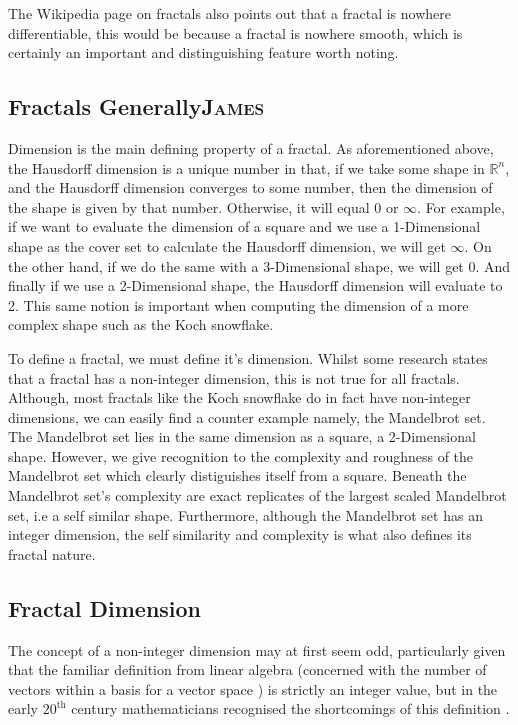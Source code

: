 \documentclass[a4paper,11pt,twoside]{article}
\begin{document}
The Wikipedia page on fractals \cite{Fractal2020} also points out that a
fractal is nowhere differentiable, this would be because a fractal is
nowhere smooth, which is certainly an important and distinguishing feature worth noting.

\subsection{Fractals Generally\hfill{}\textsc{James}}
\label{sec:org8424835}
Dimension is the main defining property of a fractal. As aforementioned above, the Hausdorff dimension is a unique number in that, if we take some shape in \(\mathbb{R}^{n}\), and the Hausdorff dimension converges to some number, then the dimension of the shape is given by that number. Otherwise, it will equal \(0\) or \(\infty\). For example, if we want to evaluate the dimension of a square and we use a 1-Dimensional shape as the cover set to calculate the Hausdorff dimension, we will get \(\infty\). On the other hand, if we do the same with a 3-Dimensional shape, we will get 0. And finally if we use a 2-Dimensional shape, the Hausdorff dimension will evaluate to 2. This same notion is important when computing the dimension of a more complex shape such as the Koch snowflake.

To define a fractal, we must define it's dimension. Whilst some research states that a fractal has a non-integer dimension, this is not true for all fractals. Although, most fractals like the Koch snowflake do in fact have non-integer dimensions, we can easily find a counter example namely, the Mandelbrot set. The Mandelbrot set lies in the same dimension as a square, a 2-Dimensional shape. However, we give recognition to the complexity and roughness of the Mandelbrot set which clearly distiguishes itself from a square. Beneath the Mandelbrot set's complexity are exact replicates of the largest scaled Mandelbrot set, i.e a self similar shape. Furthermore, although the Mandelbrot set has an integer dimension, the self similarity and complexity is what also defines its fractal nature.

\subsection{Fractal Dimension}
\label{sec:orgab4a8a1}
The concept of a non-integer dimension may at first seem odd, particularly given that the familiar definition from linear algebra (concerned with the number of vectors within a basis for a vector space \cite{larsonElementaryLinearAlgebra1991}) is strictly an integer value, but in the early \(20^{\mathrm{th}}\) century mathematicians recognised the shortcomings of this definition \cite[Ch. 3]{mandelbrotFractalGeometryNature1982}.
\end{document}
